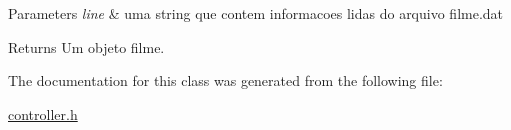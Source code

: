 \begin{DoxyParams}{Parameters}
{\em line} & uma string que contem informacoes lidas do arquivo filme.\+dat \\
\hline
\end{DoxyParams}
\begin{DoxyReturn}{Returns}
Um objeto filme. 
\end{DoxyReturn}


The documentation for this class was generated from the following file\+:\begin{DoxyCompactItemize}
\item 
\hyperlink{controller_8h}{controller.\+h}\end{DoxyCompactItemize}
